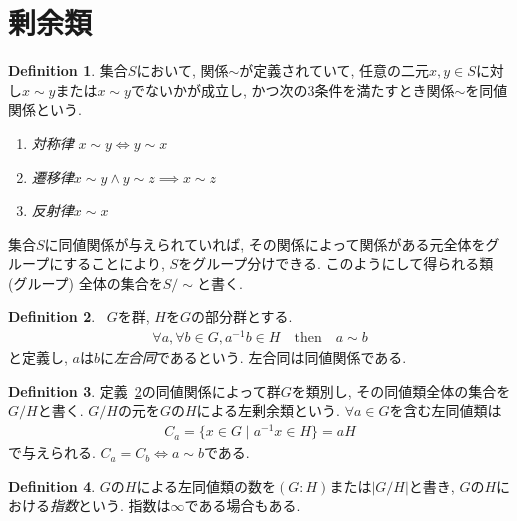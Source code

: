 \documentclass{article}
\theoremstyle{plain}
\theoremstyle{definition}
\newtheorem{definition}{Definition}
\theoremstyle{plain}
\numberwithin{equation}{section}
\numberwithin{theorem}{section}
\numberwithin{definition}{section}
\numberwithin{note}{section}
\begin{document}
\section{剰余類}
\begin{definition}
     集合$S$において, 関係$\sim$が定義されていて, 任意の二元$x,y\in S$に対し$x\sim y$または$x\sim y$でないかが成立し, かつ次の3条件を満たすとき関係$\sim$を同値関係という.
     \begin{enumerate}
          \item \emph{対称律} $x\sim y\iff y\sim x$
          \item \emph{遷移律}$x\sim y \land y\sim z \implies x\sim z$
          \item \emph{反射律}$x\sim x$
     \end{enumerate}
\end{definition}
集合$S$に同値関係が与えられていれば, その関係によって関係がある元全体をグループにすることにより, $S$をグループ分けできる. このようにして得られる類 (グループ) 全体の集合を$S/\sim$と書く.

\begin{definition}~\label{def::sim}
     $G$を群, $H$を$G$の部分群とする.
     \begin{align}
          \forall a,\forall b\in G, a^{-1}b\in H\quad\mathrm{then}\quad a\sim b
     \end{align}
     と定義し, $a$は$b$に\emph{左合同}であるという. 左合同は同値関係である. 
\end{definition}
\begin{definition}
     定義~\ref{def::sim}の同値関係によって群$G$を類別し, その同値類全体の集合を$G/H$と書く. $G/H$の元を$G$の$H$による左剰余類という. $\forall a\in G$を含む左同値類は
     \begin{align}
          C_a=\lbrace x\in G\mid a^{-1}x\in H\rbrace=aH
     \end{align}
     で与えられる. $C_a=C_b\iff a\sim b$である.
\end{definition}
\begin{definition}
     $G$の$H$による左同値類の数を$(G:H)$または$\lvert G/H\rvert$と書き, $G$の$H$における\emph{指数}という. 指数は$\infty$である場合もある.
\end{definition}
\end{document}
